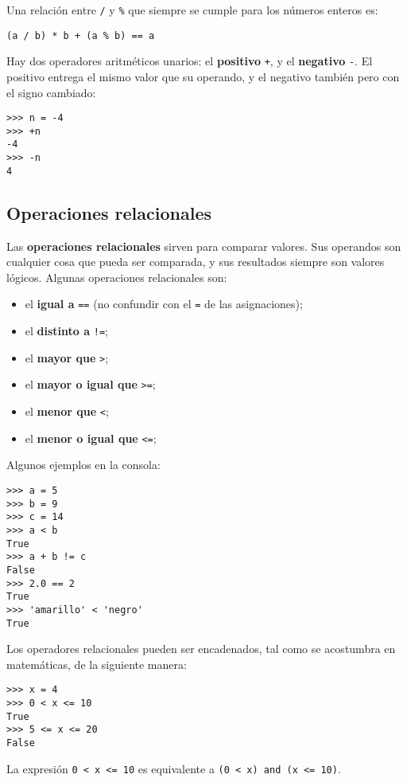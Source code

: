 Una relación entre \lstinline!/! y \lstinline!%! que siempre se cumple
para los números enteros es:
\begin{lstlisting}
(a / b) * b + (a % b) == a
\end{lstlisting}

Hay dos operadores aritméticos unarios:
el \textbf{positivo} \lstinline!+!, y
el \textbf{negativo} \lstinline!-!.
El positivo entrega el mismo valor que su operando, y el negativo
también pero con el signo cambiado:
\begin{lstlisting}
>>> n = -4
>>> +n
-4
>>> -n
4
\end{lstlisting}

\subsection{Operaciones relacionales}

Las \textbf{operaciones relacionales} sirven para comparar valores. Sus
operandos son cualquier cosa que pueda ser comparada, y sus resultados
siempre son valores lógicos.
Algunas operaciones relacionales son:

\begin{itemize}
  \item
    el \textbf{igual a} \lstinline!==! (no confundir con el \lstinline!=!
    de las asignaciones);
  \item
    el \textbf{distinto a} \lstinline"!=";
  \item
    el \textbf{mayor que} \lstinline!>!;
  \item
    el \textbf{mayor o igual que} \lstinline!>=!;
  \item
    el \textbf{menor que} \lstinline!<!;
  \item
    el \textbf{menor o igual que} \lstinline!<=!;
\end{itemize}

Algunos ejemplos en la consola:
\begin{lstlisting}
>>> a = 5
>>> b = 9
>>> c = 14
>>> a < b
True
>>> a + b != c
False
>>> 2.0 == 2
True
>>> 'amarillo' < 'negro'
True
\end{lstlisting}

Los operadores relacionales pueden ser encadenados, tal como se acostumbra en
matemáticas, de la siguiente manera:
\begin{lstlisting}
>>> x = 4
>>> 0 < x <= 10
True
>>> 5 <= x <= 20
False
\end{lstlisting}
La expresión \lstinline!0 < x <= 10! es equivalente a
\lstinline!(0 < x) and (x <= 10)!.

